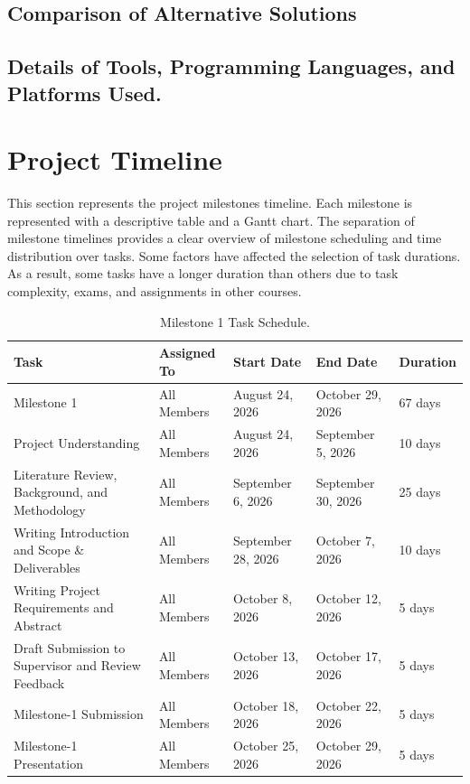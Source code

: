 \documentclass[11pt,a4paper]{report}
\begin{document}
\subsection{Comparison of Alternative Solutions}
\subsection{Details of Tools, Programming Languages, and Platforms Used.}

\cleardoublepage
\section{Project Timeline}
This section represents the project milestones timeline. Each milestone is represented with a descriptive table and a Gantt chart. The separation of milestone timelines provides a clear overview of milestone scheduling and time distribution over tasks. Some factors have affected the selection of task durations. As a result, some tasks have a longer duration than others due to task complexity, exams, and assignments in other courses.

\begin{table}[H]
\centering
\caption[Milestone 1 Task Schedule]{Milestone 1 Task Schedule.}
\begin{tabular}{|p{}| p{}| p{}| p{}| p{}|}
\hline
\textbf{Task} & \textbf{Assigned To} & \textbf{Start Date} & \textbf{End Date} & \textbf{Duration} \\
\hline
Milestone 1 & All Members & August 24, 2026 & October 29, 2026 & 67 days \\ 
\hline
Project Understanding & All Members & August 24, 2026 & September 5, 2026 & 10 days \\
\hline
Literature Review, Background, and Methodology & All Members & September 6, 2026 & September 30, 2026 & 25 days \\ 
\hline
Writing Introduction and Scope \& Deliverables & All Members & September 28, 2026 & October 7, 2026 & 10 days \\ 
\hline
Writing Project Requirements and Abstract & All Members & October 8, 2026 & October 12, 2026 & 5 days \\ 
\hline
Draft Submission to Supervisor and Review Feedback & All Members & October 13, 2026 & October 17, 2026 & 5 days \\ 
\hline
Milestone-1 Submission & All Members & October 18, 2026 & October 22, 2026 & 5 days \\ 
\hline
Milestone-1 Presentation & All Members & October 25, 2026 & October 29, 2026 & 5 days \\ 
\hline
\end{tabular}
\label{tab:milestone1_schedule}
\end{table}
\end{document}
